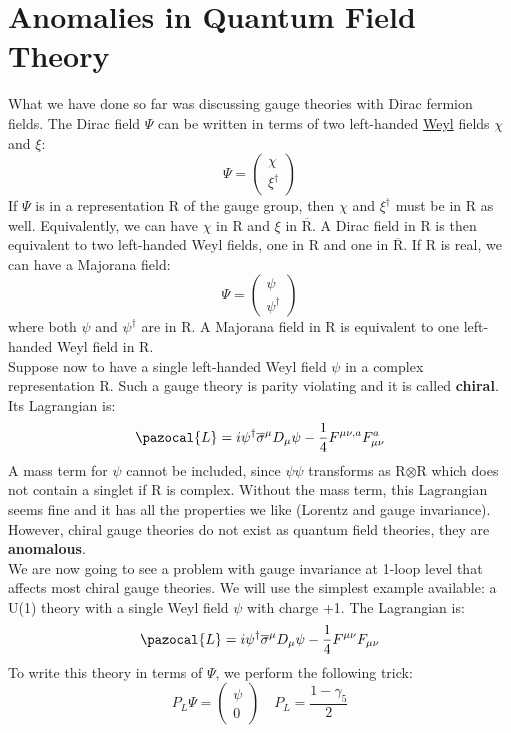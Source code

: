 \documentclass[../main.tex]{subfiles}
\begin{document}
\section{Anomalies in Quantum Field Theory}
What we have done so far was discussing gauge theories with Dirac fermion fields. The Dirac field $\Psi$ can be written in terms of two left-handed \href{https://en.wikipedia.org/wiki/Hermann_Weyl}{Weyl} fields $\chi$ and $\xi$:
\[
\Psi=\left(\begin{array}{c}
     \chi \\
     \xi^\dagger 
\end{array}\right)
\]
If $\Psi$ is in a representation R of the gauge group, then $\chi$ and $\xi^\dagger$ must be in R as well. Equivalently, we can have $\chi$ in R and $\xi$ in $\overline{\text{R}}$. A Dirac field in R is then equivalent to two left-handed Weyl fields, one in R and one in $\overline{\text{R}}$. If R is real, we can have a Majorana field:
\[
\Psi=\left(\begin{array}{c}
     \psi \\
     \psi^\dagger 
\end{array}\right)
\]
where both $\psi$ and $\psi^\dagger$ are in R. A Majorana field in R is equivalent to one left-handed Weyl field in R.\\
Suppose now to have a single left-handed Weyl field $\psi$ in a complex representation R. Such a gauge theory is parity violating and it is called \textbf{chiral}. Its Lagrangian is:
\[
\pazocal{L}=i\psi^\dagger\overline{\sigma}^\mu D_\mu\psi-\frac{1}{4}F^{\mu\nu,a}F_{\mu\nu}^a
\]
A mass term for $\psi$ cannot be included, since $\psi\psi$ transforms as R$\otimes$R which does not contain a singlet if R is complex. Without the mass term, this Lagrangian seems fine and it has all the properties we like (Lorentz and gauge invariance). However, chiral gauge theories do not exist as quantum field theories, they are \textbf{anomalous}.\\
We are now going to see a problem with gauge invariance at 1-loop level that affects most chiral gauge theories. We will use the simplest example available: a U(1) theory with a single Weyl field $\psi$ with charge +1. The Lagrangian is:
\[
\pazocal{L}=i\psi^\dagger\overline{\sigma}^\mu D_\mu\psi-\frac{1}{4}F^{\mu\nu}F_{\mu\nu}
\]
To write this theory in terms of $\Psi$, we perform the following trick:
\[
P_L\Psi=\left(\begin{array}{c}
     \psi \\
     0 
\end{array}\right)
\quad
P_L=\frac{1-\gamma_5}{2}
\]
\end{document}

